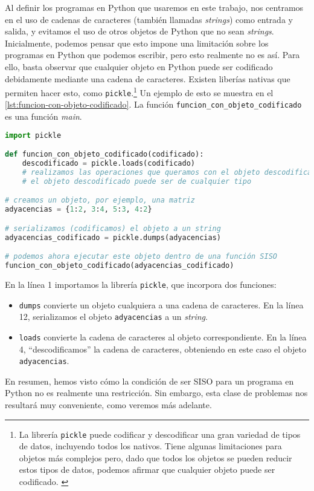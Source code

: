 Al definir los programas en Python que usaremos en este trabajo, nos centramos en el uso de cadenas de caracteres (también llamadas \emph{strings}) como entrada y salida, y evitamos el uso de otros objetos de Python que no sean \emph{strings}. Inicialmente, podemos pensar que esto impone una limitación sobre los programas en Python que podemos escribir, pero esto realmente no es así. Para ello, basta observar que cualquier objeto en Python puede ser codificado debidamente mediante una cadena de caracteres. Existen liberías nativas que permiten hacer esto, como \lstinline{pickle}.\footnote{La librería \lstinline{pickle} puede codificar y descodificar una gran variedad de tipos de datos, incluyendo todos los nativos. Tiene algunas limitaciones para objetos más complejos pero, dado que todos los objetos se pueden reducir estos tipos de datos, podemos afirmar que cualquier objeto puede ser codificado. \cite{Lutz2013}} Un ejemplo de esto se muestra en el \cref{lst:funcion-con-objeto-codificado}. La función \texttt{funcion\_con\_objeto\_codificado} es una función \emph{main}.
\vspace{8pt}
\begin{lstlisting}[language=Python, caption=\lstinline{funcion_con_objeto_codificado.py},label={lst:funcion-con-objeto-codificado}]
import pickle

def funcion_con_objeto_codificado(codificado):
    descodificado = pickle.loads(codificado)
    # realizamos las operaciones que queramos con el objeto descodificado
    # el objeto descodificado puede ser de cualquier tipo

# creamos un objeto, por ejemplo, una matriz
adyacencias = {1:2, 3:4, 5:3, 4:2}

# serializamos (codificamos) el objeto a un string
adyacencias_codificado = pickle.dumps(adyacencias)

# podemos ahora ejecutar este objeto dentro de una función SISO
funcion_con_objeto_codificado(adyacencias_codificado)
\end{lstlisting}

En la línea 1 importamos la librería \texttt{pickle}, que incorpora dos funciones:
\begin{itemize}
    \item \texttt{dumps} convierte un objeto cualquiera a una cadena de caracteres. En la línea 12, serializamos el objeto \texttt{adyacencias} a un \emph{string}.
    \item \texttt{loads} convierte la cadena de caracteres al objeto correspondiente. En la línea 4, ``descodificamos'' la cadena de caracteres, obteniendo en este caso el objeto \texttt{adyacencias}.
\end{itemize}
En resumen, hemos visto cómo la condición de ser SISO para un programa en Python no es realmente una restricción. \label{lab:siso-no-restr} Sin embargo, esta clase de problemas nos resultará muy conveniente, como veremos más adelante.

